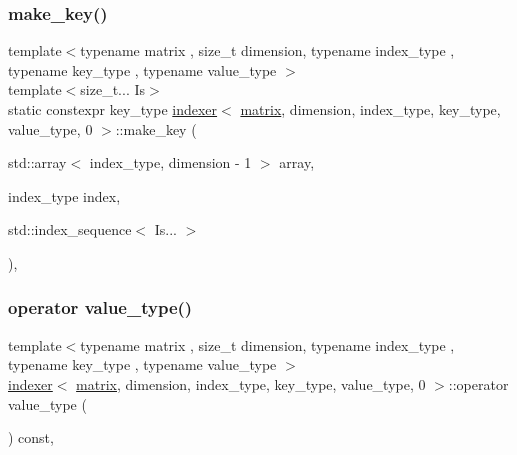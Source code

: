 \subsubsection{\texorpdfstring{make\+\_\+key()}{make\_key()}}
{\footnotesize\ttfamily template$<$typename matrix , size\+\_\+t dimension, typename index\+\_\+type , typename key\+\_\+type , typename value\+\_\+type $>$ \\
template$<$size\+\_\+t... Is$>$ \\
static constexpr key\+\_\+type \hyperlink{structindexer}{indexer}$<$ \hyperlink{structmatrix}{matrix}, dimension, index\+\_\+type, key\+\_\+type, value\+\_\+type, 0 $>$\+::make\+\_\+key (\begin{DoxyParamCaption}\item[{std\+::array$<$ index\+\_\+type, dimension -\/ 1 $>$}]{array,  }\item[{index\+\_\+type}]{index,  }\item[{std\+::index\+\_\+sequence$<$ Is... $>$}]{ }\end{DoxyParamCaption})\hspace{0.3cm}{\ttfamily [inline]}, {\ttfamily [static]}}

\mbox{\label{structindexer_3_01matrix_00_01dimension_00_01index__type_00_01key__type_00_01value__type_00_010_01_4_a9b7710fd28998876f2f8ce3ddb7ea7b8}} 
\subsubsection{\texorpdfstring{operator value\+\_\+type()}{operator value\_type()}}
{\footnotesize\ttfamily template$<$typename matrix , size\+\_\+t dimension, typename index\+\_\+type , typename key\+\_\+type , typename value\+\_\+type $>$ \\
\hyperlink{structindexer}{indexer}$<$ \hyperlink{structmatrix}{matrix}, dimension, index\+\_\+type, key\+\_\+type, value\+\_\+type, 0 $>$\+::operator value\+\_\+type (\begin{DoxyParamCaption}{ }\end{DoxyParamCaption}) const\hspace{0.3cm}{\ttfamily [inline]}, {\ttfamily [explicit]}}

